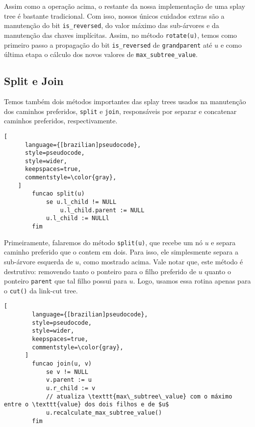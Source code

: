 Assim como a operação acima, o restante da nossa implementação de uma splay tree é bastante tradicional. Com isso, nossos únicos cuidados extras são a manutenção do bit \texttt{is\_reversed}, do valor máximo das sub-árvores e da manutenção das chaves implícitas. Assim, no método \texttt{rotate(u)}, temos como primeiro passo a propagação do bit \texttt{is\_reversed} de \texttt{grandparent} até $u$ e como última etapa o cálculo dos novos valores de \texttt{max\_subtree\_value}.

\subsection{Split e Join}
\label{subsection:lct-splay-split-join}

Temos também dois métodos importantes das splay trees usados na manutenção dos caminhos preferidos, \texttt{split} e \texttt{join}, responsáveis por separar e concatenar caminhos preferidos, respectivamente.

\begin{programruledcaption}{\label{splay:split}}
    \begin{lstlisting}[
      language={[brazilian]pseudocode},
      style=pseudocode,
      style=wider,
      keepspaces=true,
      commentstyle=\color{gray},
    ]
        funcao split(u)
            se u.l_child != NULL
                u.l_child.parent := NULL    
            u.l_child := NULLl
        fim
    \end{lstlisting}
\end{programruledcaption}

Primeiramente, falaremos do método \texttt{split(u)}, que recebe um nó $u$ e separa caminho preferido que o contem em dois. Para isso, ele simplesmente separa a sub-árvore esquerda de $u$, como mostrado acima. Vale notar que, este método é destrutivo: removendo tanto o ponteiro para o filho preferido de $u$ quanto o ponteiro \texttt{parent} que tal filho possui para $u$. Logo, usamos essa rotina apenas para o \texttt{cut()} da link-cut tree.

\begin{programruledcaption}{\label{splay:join}}
    \begin{lstlisting}[
        language={[brazilian]pseudocode},
        style=pseudocode,
        style=wider,
        keepspaces=true,
        commentstyle=\color{gray},
      ]
        funcao join(u, v)
            se v != NULL
            v.parent := u
            u.r_child := v
            // atualiza \texttt{max\_subtree\_value} com o máximo entre o \texttt{value} dos dois filhos e de $u$ 
            u.recalculate_max_subtree_value() 
        fim
    \end{lstlisting}
\end{programruledcaption}


